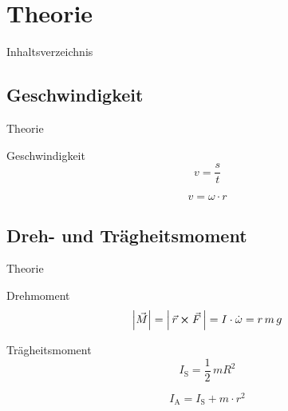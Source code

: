 \section{Theorie}

\begin{frame}{Inhaltsverzeichnis}
\end{frame} 

\subsection{Geschwindigkeit}
\begin{frame}[t]{Theorie}
    \begin{block}{Geschwindigkeit}    
    \begin{equation*}
        v= \frac{s}{t}
    \end{equation*}
    
    \begin{equation*}
        v = \omega \cdot r
    \end{equation*}
\end{block}
\end{frame}

\subsection{Dreh- und Trägheitsmoment}

\begin{frame}[t]{Theorie}
    \begin{block}{Drehmoment}
    \begin{equation}
        \abs{\vec{M}} = \abs{\,\vec{r} \cross \vec{F}\, } = I \cdot \dot{\omega} = r\, m\, g
        \label{eqn:drehmoment}
    \end{equation}
    \end{block}

    \begin{block}{Trägheitsmoment}
    \begin{equation}
        I_\text{S}= \frac{1}{2}\, m R^2 
        \label{eqn:trägheit}
    \end{equation}

    \begin{equation}
        I_\text{A} = I_\text{S}+ m \cdot r^2
        \label{eqn:steiner}
    \end{equation}
    \end{block}
\end{frame}



